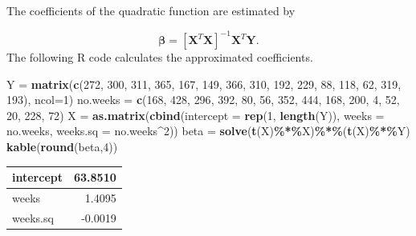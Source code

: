 \documentclass[
]{book}
\newenvironment{Shaded}{\begin{snugshade}}{\end{snugshade}}
\newcommand{\AttributeTok}[1]{\textcolor[rgb]{0.13,0.29,0.53}{#1}}
\newcommand{\DecValTok}[1]{\textcolor[rgb]{0.00,0.00,0.81}{#1}}
\newcommand{\FunctionTok}[1]{\textcolor[rgb]{0.13,0.29,0.53}{\textbf{#1}}}
\newcommand{\NormalTok}[1]{#1}
\newcommand{\OtherTok}[1]{\textcolor[rgb]{0.56,0.35,0.01}{#1}}
\newcommand{\SpecialCharTok}[1]{\textcolor[rgb]{0.81,0.36,0.00}{\textbf{#1}}}
\begin{document}
The coefficients of the quadratic function are estimated by

\[
\mathbf{\beta} = [\mathbf{X}^T \mathbf{X}]^{-1} \mathbf{X}^T\mathbf{Y}.
\]
The following R code calculates the approximated coefficients.

\begin{Shaded}
\begin{Highlighting}[]
\NormalTok{Y }\OtherTok{=} \FunctionTok{matrix}\NormalTok{(}\FunctionTok{c}\NormalTok{(}\DecValTok{272}\NormalTok{, }\DecValTok{300}\NormalTok{, }\DecValTok{311}\NormalTok{, }\DecValTok{365}\NormalTok{, }\DecValTok{167}\NormalTok{, }\DecValTok{149}\NormalTok{, }\DecValTok{366}\NormalTok{, }\DecValTok{310}\NormalTok{, }\DecValTok{192}\NormalTok{, }\DecValTok{229}\NormalTok{, }\DecValTok{88}\NormalTok{, }\DecValTok{118}\NormalTok{, }\DecValTok{62}\NormalTok{, }\DecValTok{319}\NormalTok{, }\DecValTok{193}\NormalTok{), }\AttributeTok{ncol=}\DecValTok{1}\NormalTok{)}
\NormalTok{no.weeks }\OtherTok{=} \FunctionTok{c}\NormalTok{(}\DecValTok{168}\NormalTok{, }\DecValTok{428}\NormalTok{, }\DecValTok{296}\NormalTok{, }\DecValTok{392}\NormalTok{, }\DecValTok{80}\NormalTok{, }\DecValTok{56}\NormalTok{, }\DecValTok{352}\NormalTok{, }\DecValTok{444}\NormalTok{, }\DecValTok{168}\NormalTok{, }\DecValTok{200}\NormalTok{, }\DecValTok{4}\NormalTok{, }\DecValTok{52}\NormalTok{, }\DecValTok{20}\NormalTok{, }\DecValTok{228}\NormalTok{, }\DecValTok{72}\NormalTok{)}
\NormalTok{X }\OtherTok{=} \FunctionTok{as.matrix}\NormalTok{(}\FunctionTok{cbind}\NormalTok{(}\AttributeTok{intercept =} \FunctionTok{rep}\NormalTok{(}\DecValTok{1}\NormalTok{, }\FunctionTok{length}\NormalTok{(Y)), }\AttributeTok{weeks =}\NormalTok{ no.weeks, }\AttributeTok{weeks.sq =}\NormalTok{ no.weeks}\SpecialCharTok{\^{}}\DecValTok{2}\NormalTok{))}
\NormalTok{beta }\OtherTok{=} \FunctionTok{solve}\NormalTok{(}\FunctionTok{t}\NormalTok{(X)}\SpecialCharTok{\%*\%}\NormalTok{X)}\SpecialCharTok{\%*\%}\NormalTok{(}\FunctionTok{t}\NormalTok{(X)}\SpecialCharTok{\%*\%}\NormalTok{Y)}
\FunctionTok{kable}\NormalTok{(}\FunctionTok{round}\NormalTok{(beta,}\DecValTok{4}\NormalTok{))}
\end{Highlighting}
\end{Shaded}

\begin{tabular}{l|r}
\hline
intercept & 63.8510\\
\hline
weeks & 1.4095\\
\hline
weeks.sq & -0.0019\\
\hline
\end{tabular}
\end{document}
